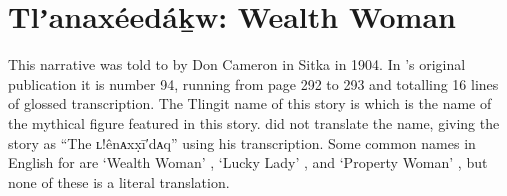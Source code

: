 
\resetexcnt
\chapter{Tlʼanaxéedáḵw: Wealth Woman}\label{ch:94-wealth-woman}

This narrative was told to \citeauthor{swanton:1909} by  Don Cameron in Sitka in 1904.
In \citeauthor{swanton:1909}’s original publication it is number 94, running from page 292 to 293 and totalling 16 lines of glossed transcription.
The Tlingit name of this story is  which is the name of the mythical figure featured in this story.
\citeauthor{swanton:1909} did not translate the name, giving the story as “The ʟ!ênᴀxx̣ī′dᴀq” using his transcription.
Some common names in English for  are ‘Wealth Woman’ , ‘Lucky Lady’ , and ‘Property Woman’ , but none of these is a literal translation.

